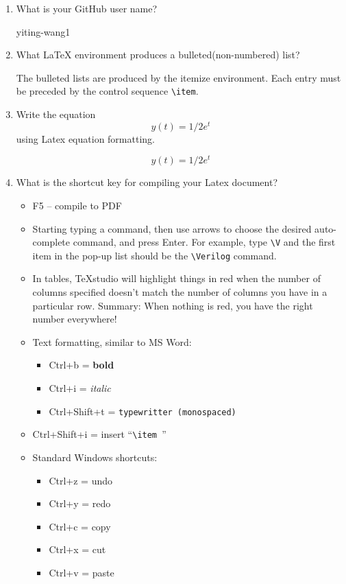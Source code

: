 \documentclass[11pt]{article}
\newcommand{\Verilog}[2][]{%
	
}
\begin{document}
\begin{enumerate}
	\item What is your GitHub user name?
	
		yiting-wang1
	
	\item What  LaTeX  environment  produces  a  bulleted(non-numbered) list?
	
		The bulleted lists are produced by the itemize environment. Each entry must be preceded by the control sequence \verb|\item|.
	
	\item Write the equation \[ y(t) = 1/2 e^t \]  using Latex equation formatting.
	
		 \[ y(t) = 1/2 e^t \] 
	
	\item What is the shortcut key for compiling your Latex document?
	
		\begin{itemize}
			\item F5 -- compile to PDF
			\item Starting typing a command, then use arrows to choose the desired auto-complete command, and press Enter.  For example, type \verb|\V| and the first item in the pop-up list should be the \verb|\Verilog| command.
			\item In tables, TeXstudio will highlight things in red when the number of columns specified doesn't match the number of columns you have in a particular row.  Summary: When nothing is red, you have the right number everywhere!
			\item Text formatting, similar to MS Word:
			\begin{itemize}
				\item Ctrl+b = \textbf{bold}
				\item Ctrl+i = \textit{italic}
				\item Ctrl+Shift+t = \texttt{typewritter (monospaced)}
			\end{itemize}
			\item Ctrl+Shift+i = insert ``\verb|\item |''
			\item Standard Windows shortcuts:
			\begin{itemize}
				\item Ctrl+z = undo
				\item Ctrl+y = redo
				\item Ctrl+c = copy
				\item Ctrl+x = cut
				\item Ctrl+v = paste
			\end{itemize}
		\end{itemize}

\end{enumerate}
	
\end{document}
